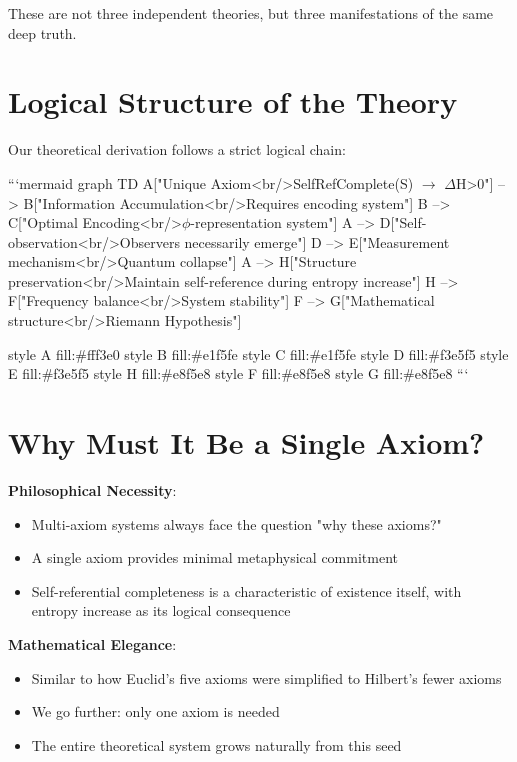These are not three independent theories, but three manifestations of the same deep truth.

\section{Logical Structure of the Theory}
\label{sec:ch03_derivation:logical-structure-of-the-theory}

Our theoretical derivation follows a strict logical chain:

```mermaid
graph TD
    A["Unique Axiom<br/>SelfRefComplete(S) $\rightarrow$ $\Delta$H>0"] --> B["Information Accumulation<br/>Requires encoding system"]
    B --> C["Optimal Encoding<br/>$\phi$-representation system"]
    A --> D["Self-observation<br/>Observers necessarily emerge"]
    D --> E["Measurement mechanism<br/>Quantum collapse"]
    A --> H["Structure preservation<br/>Maintain self-reference during entropy increase"]
    H --> F["Frequency balance<br/>System stability"]
    F --> G["Mathematical structure<br/>Riemann Hypothesis"]

    style A fill:\#fff3e0
    style B fill:\#e1f5fe
    style C fill:\#e1f5fe
    style D fill:\#f3e5f5
    style E fill:\#f3e5f5
    style H fill:\#e8f5e8
    style F fill:\#e8f5e8
    style G fill:\#e8f5e8
```

\section{Why Must It Be a Single Axiom?}
\label{sec:ch03_derivation:why-must-it-be-a-single-axiom}

\textbf{Philosophical Necessity}:
\begin{itemize}
\item Multi-axiom systems always face the question "why these axioms?"
\item A single axiom provides minimal metaphysical commitment
\item Self-referential completeness is a characteristic of existence itself, with entropy increase as its logical consequence
\end{itemize}

\textbf{Mathematical Elegance}:
\begin{itemize}
\item Similar to how Euclid's five axioms were simplified to Hilbert's fewer axioms
\item We go further: only one axiom is needed
\item The entire theoretical system grows naturally from this seed
\end{itemize}

